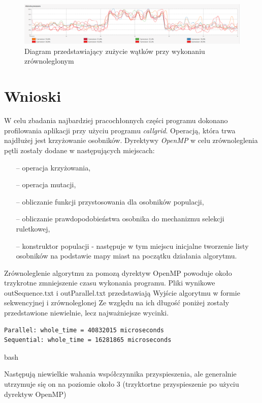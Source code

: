 \documentclass[10pt,a4paper]{article}
\begin{document}
\begin{figure}[H]
\includegraphics[scale=0.18]{zrzutParallel.png}
\centering
\caption{\label{diagramParallel}Diagram przedstawiający zużycie wątków przy wykonaniu zrównoleglonym}
\end{figure}


\section{Wnioski}
W celu zbadania najbardziej pracochłonnych części programu dokonano profilowania aplikacji przy użyciu programu \textit{callgrid}. Operacją, która trwa najdłużej jest krzyżowanie osobników. Dyrektywy \textit{OpenMP} w celu zrównoleglenia pętli zostały dodane w następujących miejscach:
\begin{itemize}
\item[--] operacja krzyżowania,
\item[--] operacja mutacji,
\item[--] obliczanie funkcji przystosowania dla osobników populacji,
\item[--] obliczanie prawdopodobieństwa osobnika do mechanizmu selekcji ruletkowej,
\item[--] konstruktor populacji - następuje w tym miejscu inicjalne tworzenie listy osobników na podstawie mapy miast na początku działania algorytmu.
\end{itemize}

Zrównoleglenie algorytmu za pomozą dyrektyw OpenMP powoduje około trzykrotne zmniejszenie czasu wykonania programu. Pliki wynikowe outSequence.txt i outParallel.txt przedstawiają Wyjście algorytmu w formie sekwencyjnej i zrównoleglonej Ze względu na ich długość poniżej zostały przedstawione niewielnie, lecz najważniejsze wycinki.

\begin{verbatim}
Parallel: whole_time = 40832015 microseconds
Sequential: whole_time = 16281865 microseconds
\end{verbatim}{bash}

Następują niewielkie wahania współczynnika przyspieszenia, ale generalnie utrzymuje się on na poziomie około 3 (trzyktortne przyspieszenie po użyciu dyrektyw OpenMP)
\end{document}
